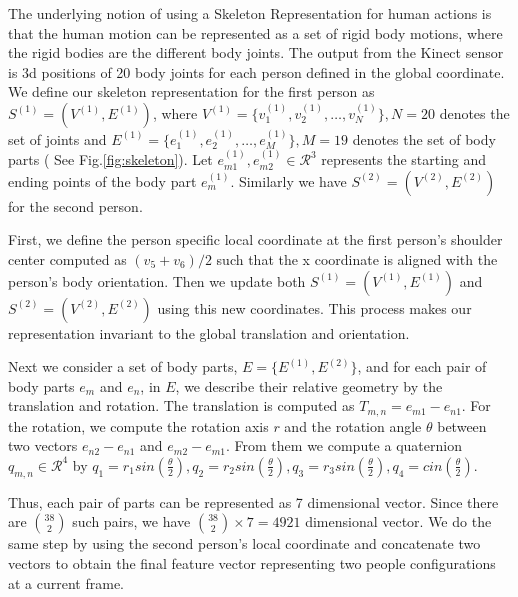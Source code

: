 \documentclass[10pt,twocolumn,letterpaper]{article}
\begin{document}
The underlying notion of using a Skeleton Representation for human actions is that the human motion can be represented as a set of rigid body motions, where the rigid bodies are the different body joints. The output from the Kinect sensor is 3d positions of 20 body joints for each person defined in the global coordinate. We define our skeleton representation for the first person as $S^{(1)}=(V^{(1)},E^{(1)})$, where $V^{(1)}=\{v_{1}^{(1)},v_{2}^{(1)},\dots,v_{N}^{(1)}\}, N=20$ denotes the set of joints and $E^{(1)}=\{e_{1}^{(1)},e_{2}^{(1)},\dots,e_{M}^{(1)}\}, M=19$ denotes the set of body parts ( See Fig.\ref{fig:skeleton}). Let $e_{m1}^{(1)},e_{m2}^{(1)} \in \mathcal{R}^3$ represents the starting and ending points of the body part $e_{m}^{(1)}$. Similarly we have $S^{(2)}=(V^{(2)},E^{(2)})$ for the second person.

First, we define the person specific local coordinate at the first person's shoulder center computed as $(v_5 + v_6)/2$ such that the x coordinate is aligned with the person's body orientation. Then we update both $S^{(1)}=(V^{(1)},E^{(1)})$ and $S^{(2)}=(V^{(2)},E^{(2)})$ using this new coordinates. This process makes our representation invariant to the global translation and orientation. 

Next we consider a set of body parts, $E=\{E^{(1)},E^{(2)}\}$, and for each pair of body parts $e_m$ and $e_n$, in $E$, we describe their relative geometry by the translation and rotation. The translation is computed as $T_{m,n}=e_{m1}-e_{n1}$. For the rotation, we compute the rotation axis $r$ and the rotation angle $\theta$ between two vectors $e_{n2}-e_{n1}$ and $e_{m2}-e_{m1}$. From them we compute a quaternion $q_{m,n} \in \mathcal{R}^4$ by $q_1=r_1 sin( \frac{\theta}{2} ), q_2=r_2 sin( \frac{\theta}{2} ), q_3=r_3 sin( \frac{\theta}{2}), q_4=cin( \frac{\theta}{2})$.

Thus, each pair of parts can be represented as 7 dimensional vector. Since there are $\binom{38}{2}$ such pairs, we have $\binom{38}{2} \times 7 = 4921$ dimensional vector. We do the same step by using the second person's local coordinate and concatenate two vectors to obtain the final feature vector representing two people configurations at a current frame.
\end{document}
